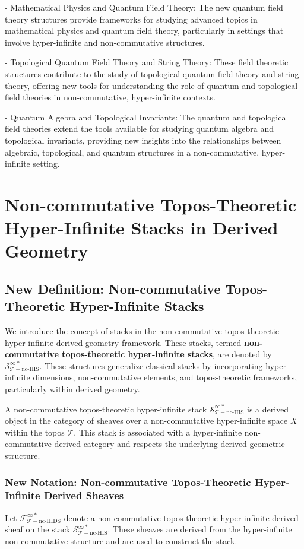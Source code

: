 \documentclass{article}
\begin{document}
- Mathematical Physics and Quantum Field Theory: The new quantum field theory structures provide frameworks for studying advanced topics in mathematical physics and quantum field theory, particularly in settings that involve hyper-infinite and non-commutative structures.

- Topological Quantum Field Theory and String Theory: These field theoretic structures contribute to the study of topological quantum field theory and string theory, offering new tools for understanding the role of quantum and topological field theories in non-commutative, hyper-infinite contexts.

- Quantum Algebra and Topological Invariants: The quantum and topological field theories extend the tools available for studying quantum algebra and topological invariants, providing new insights into the relationships between algebraic, topological, and quantum structures in a non-commutative, hyper-infinite setting.


\section{Non-commutative Topos-Theoretic Hyper-Infinite Stacks in Derived Geometry}
\subsection{New Definition: Non-commutative Topos-Theoretic Hyper-Infinite Stacks}
We introduce the concept of stacks in the non-commutative topos-theoretic hyper-infinite derived geometry framework. These stacks, termed \textbf{non-commutative topos-theoretic hyper-infinite stacks}, are denoted by \(\mathcal{S}_{\mathcal{T}-\text{nc-HIS}}^{\infty *}\). These structures generalize classical stacks by incorporating hyper-infinite dimensions, non-commutative elements, and topos-theoretic frameworks, particularly within derived geometry.

A non-commutative topos-theoretic hyper-infinite stack \(\mathcal{S}_{\mathcal{T}-\text{nc-HIS}}^{\infty *}\) is a derived object in the category of sheaves over a non-commutative hyper-infinite space \(X\) within the topos \(\mathcal{T}\). This stack is associated with a hyper-infinite non-commutative derived category and respects the underlying derived geometric structure.

\subsubsection{New Notation: Non-commutative Topos-Theoretic Hyper-Infinite Derived Sheaves}
Let \(\mathcal{F}_{\mathcal{T}-\text{nc-HIDS}}^{\infty *}\) denote a non-commutative topos-theoretic hyper-infinite derived sheaf on the stack \(\mathcal{S}_{\mathcal{T}-\text{nc-HIS}}^{\infty *}\). These sheaves are derived from the hyper-infinite non-commutative structure and are used to construct the stack.
\end{document}
